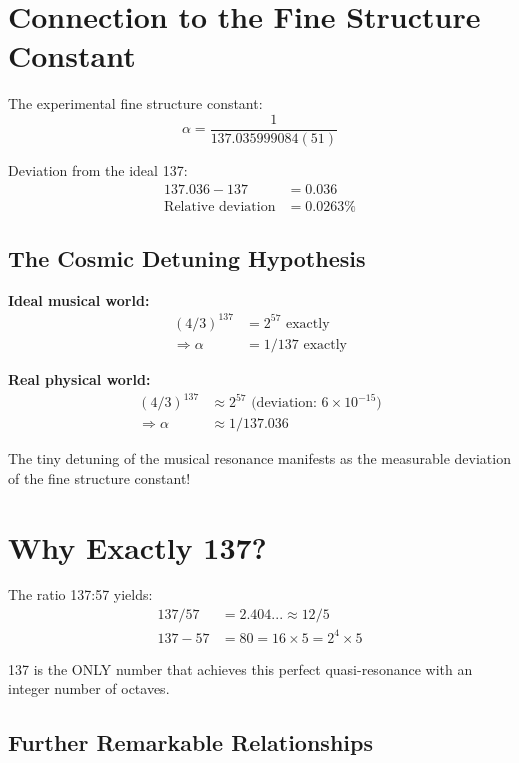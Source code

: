 	\section{Connection to the Fine Structure Constant}
	
	The experimental fine structure constant:
	\begin{equation}
		\alpha = \frac{1}{137.035999084(51)}
	\end{equation}
	
	Deviation from the ideal 137:
	\begin{align}
		137.036 - 137 &= 0.036\\
		\text{Relative deviation} &= 0.0263\%
	\end{align}
	
	\subsection{The Cosmic Detuning Hypothesis}
	
	\textbf{Ideal musical world:}
	\begin{align}
		(4/3)^{137} &= 2^{57} \text{ exactly}\\
		\Rightarrow \alpha &= 1/137 \text{ exactly}
	\end{align}
	
	\textbf{Real physical world:}
	\begin{align}
		(4/3)^{137} &\approx 2^{57} \text{ (deviation: } 6 \times 10^{-15}\text{)}\\
		\Rightarrow \alpha &\approx 1/137.036
	\end{align}
	
	The tiny detuning of the musical resonance manifests as the measurable deviation of the fine structure constant!
	
	\section{Why Exactly 137?}
	
	The ratio 137:57 yields:
	\begin{align}
		137/57 &= 2.404... \approx 12/5\\
		137 - 57 &= 80 = 16 \times 5 = 2^4 \times 5
	\end{align}
	
	137 is the ONLY number that achieves this perfect quasi-resonance with an integer number of octaves.
	
	\subsection{Further Remarkable Relationships}
	
